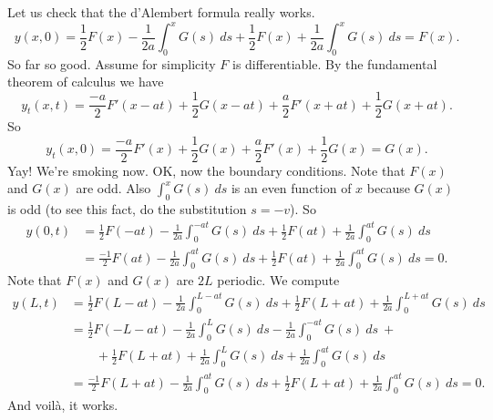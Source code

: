\documentclass[12pt]{book}
\begin{document}
Let us check that the d'Alembert formula really works.
\begin{equation*}
y(x,0) =
\frac{1}{2} F(x) - \frac{1}{2a} \int_0^{x} G(s) ~ds
+
\frac{1}{2} F(x) + \frac{1}{2a} \int_0^{x} G(s) ~ds =  F(x) .
\end{equation*}
So far so good.  Assume for simplicity $F$ is differentiable.
By the fundamental theorem of calculus we have
\begin{equation*}
y_t(x,t) =
\frac{-a}{2} F'(x-at) + \frac{1}{2} G(x-at)
+
\frac{a}{2} F'(x+at) + \frac{1}{2} G(x+at) .
\end{equation*}
So
\begin{equation*}
y_t(x,0) =
\frac{-a}{2} F'(x) + \frac{1}{2} G(x)
+
\frac{a}{2} F'(x) + \frac{1}{2} G(x) = G(x) .
\end{equation*}
Yay!  We're smoking now.  OK, now the boundary conditions.  Note
that $F(x)$ and $G(x)$ are odd.  Also $\int_0^x G(s) ~ds$ is an even function
of $x$ because $G(x)$ is odd (to see this fact, do the substitution $s=-v$).
So
\begin{equation*}
\begin{split}
y(0,t) & =
\frac{1}{2} F(-at) - \frac{1}{2a} \int_0^{-at} G(s) ~ds
+
\frac{1}{2} F(at) + \frac{1}{2a} \int_0^{at} G(s) ~ds \\
& = 
\frac{-1}{2} F(at) - \frac{1}{2a} \int_0^{at} G(s) ~ds
+
\frac{1}{2} F(at) + \frac{1}{2a} \int_0^{at} G(s) ~ds = 0 .
\end{split}
\end{equation*}
Note that $F(x)$ and $G(x)$ are $2L$ periodic.  We compute
\begin{equation*}
\begin{split}
y(L,t) & =
\frac{1}{2} F(L-at) - \frac{1}{2a} \int_0^{L-at} G(s) ~ds
+
\frac{1}{2} F(L+at) + \frac{1}{2a} \int_0^{L+at} G(s) ~ds \\
& = 
\frac{1}{2} F(-L-at)
- \frac{1}{2a} \int_0^{L} G(s) ~ds
- \frac{1}{2a} \int_0^{-at} G(s) ~ds ~+ \\
& \qquad
+
\frac{1}{2} F(L+at)
+ \frac{1}{2a} \int_0^{L} G(s) ~ds
+ \frac{1}{2a} \int_0^{at} G(s) ~ds \\
& = 
\frac{-1}{2} F(L+at)
- \frac{1}{2a} \int_0^{at} G(s) ~ds
+ \frac{1}{2} F(L+at)
+ \frac{1}{2a} \int_0^{at} G(s) ~ds
=0 .
\end{split}
\end{equation*}
And voil\`a, it works.
\end{document}

